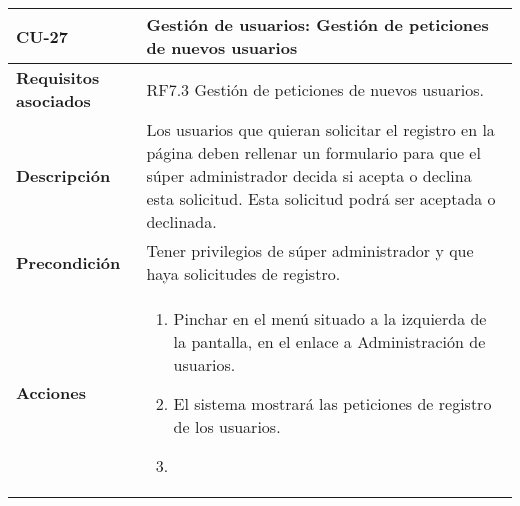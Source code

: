 \newpage
\begin{longtable}[t]{@{}ll@{}}
\toprule
\begin{minipage}[t]{0.23\columnwidth}\raggedright\strut
\textbf{CU-27}\strut
\end{minipage} & \begin{minipage}[b]{0.71\columnwidth}\raggedright\strut
\textbf{Gestión de usuarios:  Gestión de peticiones de nuevos usuarios}\strut
\end{minipage}\tabularnewline
\midrule
\endhead
\begin{minipage}[t]{0.23\columnwidth}\raggedright\strut
\textbf{Requisitos asociados}\strut
\end{minipage} & \begin{minipage}[t]{0.71\columnwidth}\raggedright\strut
RF7.3  Gestión de peticiones de nuevos usuarios. \strut
\end{minipage}\tabularnewline
\begin{minipage}[t]{0.23\columnwidth}\raggedright\strut
\textbf{Descripción}\strut
\end{minipage} & \begin{minipage}[t]{0.71\columnwidth}\raggedright\strut
Los usuarios que quieran solicitar el registro en la página deben rellenar un
formulario para que el súper administrador decida si acepta o declina esta
solicitud. Esta solicitud podrá ser aceptada o declinada.
\strut
\end{minipage}\tabularnewline
\begin{minipage}[t]{0.23\columnwidth}\raggedright\strut
\textbf{Precondición}\strut
\end{minipage} & \begin{minipage}[t]{0.71\columnwidth}\raggedright\strut
Tener privilegios de súper administrador y que haya solicitudes de registro.\strut
\end{minipage}\tabularnewline
\begin{minipage}[t]{0.23\columnwidth}\raggedright\strut
\textbf{Acciones}\strut
\end{minipage} & \begin{minipage}[t]{0.71\columnwidth}\raggedright\strut
\begin{enumerate}
\def\labelenumi{\arabic{enumi}.}
\tightlist
\item
Pinchar en el menú situado a la izquierda de la pantalla, en el
enlace a Administración de usuarios.
\item
El sistema mostrará las peticiones de registro de los usuarios.
\item

\end{enumerate}
\end{minipage}
\end{longtable}
